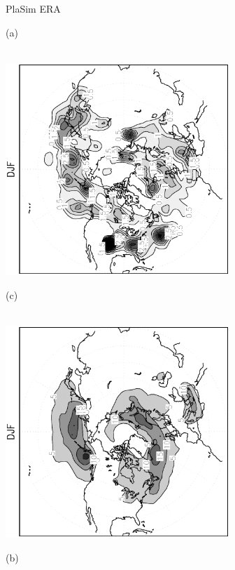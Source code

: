 \documentclass[12pt,a4paper,twoside,openright,headinclude,liststotoc,bibtotoc]{scrreprt}
\begin{document}
\begin{appendix}
\begin{figure}[b]
\hspace{3.8cm}PlaSim \vspace{0.2cm} \hspace{7.3cm} ERA \\
\parbox{8.5cm}{\hspace{0.95cm}\begin{scriptsize}(a)\end{scriptsize} \vspace{-0.5cm} \\
\includegraphics[height=8.0cm,angle=-90]
{eps/cyclgen_PLASIM_T21_45DJF.eps}
}
\parbox{8.5cm}{\hspace{0.95cm}\begin{scriptsize}(c)\end{scriptsize} \vspace{-0.5cm} \\
\includegraphics[height=8.0cm,angle=-90]
{eps/cycldensity_ERA40_T21_45DJF.eps}
}
\parbox{8.5cm}{\hspace{0.95cm}\begin{scriptsize}(b)\end{scriptsize} \vspace{-0.5cm} \\
}
\end{figure}
\end{appendix}
\end{document}
